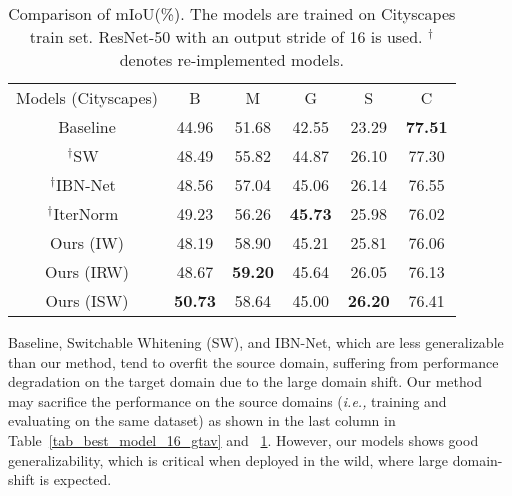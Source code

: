 \documentclass[final]{latex/cvpr}
\newcommand{\drule}{\specialrule{0.2pt}{1pt}{1pt}\specialrule{0.2pt}{0pt}{\belowrulesep}}
\begin{document}
\begin{table}[b!]
\vspace{-0.4cm}
\begin{center}
\footnotesize
\begin{tabular}{c|c|c|c|c||c}
\toprule
Models (Cityscapes) & B & M & G & S & C \\
\drule
Baseline  & 44.96      & 51.68      & 42.55      & 23.29      & \textbf{77.51}  \\ 
\midrule
$^\dagger$SW~\cite{pan2019switchable} & 48.49      & 55.82 & 44.87      & 26.10      & 77.30       \\ 
\midrule
$^\dagger$IBN-Net~\cite{pan2018two}      & 48.56      & 57.04      & 45.06      & 26.14      & 76.55      \\ 
\midrule
$^\dagger$IterNorm~\cite{huang2019iterative} & 49.23      & 56.26 & \textbf{45.73}      & 25.98      & 76.02       \\ 
\midrule
Ours (IW) & 48.19      & 58.90      & 45.21      & 25.81      & 76.06      \\ 
\midrule
Ours (IRW)                   & 48.67 & \textbf{59.20} & 45.64
& 26.05      & 76.13      \\ 
\midrule
Ours (ISW)                   & \textbf{50.73} & 58.64 & 45.00 & \textbf{26.20} & 76.41      \\ 
\bottomrule
\end{tabular}
\end{center}
\vspace*{-0.17cm}
\caption{Comparison of mIoU(\%). The models are trained on Cityscapes train set. ResNet-50 with an output stride of 16 is used.
$^\dagger$ denotes re-implemented models.}
\label{tab_best_model_16_city}
\vspace{-0.2cm}
\end{table}

Baseline, Switchable Whitening (SW), and IBN-Net, which are less generalizable than our method, tend to overfit the source domain, suffering from performance degradation on the target domain due to the large domain shift. 
Our method may sacrifice the performance on the source domains (\textit{i.e.,} training and evaluating on the same dataset) as shown in the last column in Table~\ref{tab_best_model_16_gtav} and ~\ref{tab_best_model_16_city}. 
However, our models shows good generalizability, which is critical when deployed in the wild, where large domain-shift is expected.
\end{document}
